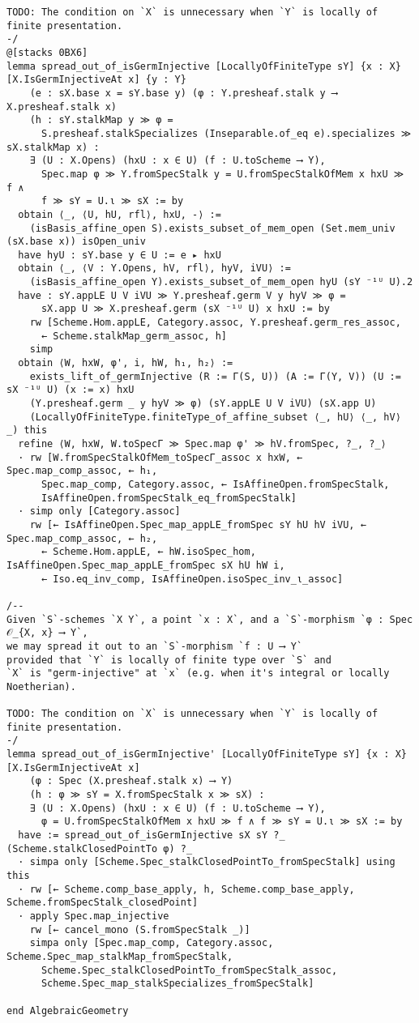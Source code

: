 \documentclass{article}
\begin{document}
\begin{lstlisting}[language=Lean, caption={SpreadingOut.lean}]
TODO: The condition on `X` is unnecessary when `Y` is locally of finite presentation.
-/
@[stacks 0BX6]
lemma spread_out_of_isGermInjective [LocallyOfFiniteType sY] {x : X} [X.IsGermInjectiveAt x] {y : Y}
    (e : sX.base x = sY.base y) (φ : Y.presheaf.stalk y ⟶ X.presheaf.stalk x)
    (h : sY.stalkMap y ≫ φ =
      S.presheaf.stalkSpecializes (Inseparable.of_eq e).specializes ≫ sX.stalkMap x) :
    ∃ (U : X.Opens) (hxU : x ∈ U) (f : U.toScheme ⟶ Y),
      Spec.map φ ≫ Y.fromSpecStalk y = U.fromSpecStalkOfMem x hxU ≫ f ∧
      f ≫ sY = U.ι ≫ sX := by
  obtain ⟨_, ⟨U, hU, rfl⟩, hxU, -⟩ :=
    (isBasis_affine_open S).exists_subset_of_mem_open (Set.mem_univ (sX.base x)) isOpen_univ
  have hyU : sY.base y ∈ U := e ▸ hxU
  obtain ⟨_, ⟨V : Y.Opens, hV, rfl⟩, hyV, iVU⟩ :=
    (isBasis_affine_open Y).exists_subset_of_mem_open hyU (sY ⁻¹ᵁ U).2
  have : sY.appLE U V iVU ≫ Y.presheaf.germ V y hyV ≫ φ =
      sX.app U ≫ X.presheaf.germ (sX ⁻¹ᵁ U) x hxU := by
    rw [Scheme.Hom.appLE, Category.assoc, Y.presheaf.germ_res_assoc,
      ← Scheme.stalkMap_germ_assoc, h]
    simp
  obtain ⟨W, hxW, φ', i, hW, h₁, h₂⟩ :=
    exists_lift_of_germInjective (R := Γ(S, U)) (A := Γ(Y, V)) (U := sX ⁻¹ᵁ U) (x := x) hxU
    (Y.presheaf.germ _ y hyV ≫ φ) (sY.appLE U V iVU) (sX.app U)
    (LocallyOfFiniteType.finiteType_of_affine_subset ⟨_, hU⟩ ⟨_, hV⟩ _) this
  refine ⟨W, hxW, W.toSpecΓ ≫ Spec.map φ' ≫ hV.fromSpec, ?_, ?_⟩
  · rw [W.fromSpecStalkOfMem_toSpecΓ_assoc x hxW, ← Spec.map_comp_assoc, ← h₁,
      Spec.map_comp, Category.assoc, ← IsAffineOpen.fromSpecStalk,
      IsAffineOpen.fromSpecStalk_eq_fromSpecStalk]
  · simp only [Category.assoc]
    rw [← IsAffineOpen.Spec_map_appLE_fromSpec sY hU hV iVU, ← Spec.map_comp_assoc, ← h₂,
      ← Scheme.Hom.appLE, ← hW.isoSpec_hom, IsAffineOpen.Spec_map_appLE_fromSpec sX hU hW i,
      ← Iso.eq_inv_comp, IsAffineOpen.isoSpec_inv_ι_assoc]

/--
Given `S`-schemes `X Y`, a point `x : X`, and a `S`-morphism `φ : Spec 𝒪_{X, x} ⟶ Y`,
we may spread it out to an `S`-morphism `f : U ⟶ Y`
provided that `Y` is locally of finite type over `S` and
`X` is "germ-injective" at `x` (e.g. when it's integral or locally Noetherian).

TODO: The condition on `X` is unnecessary when `Y` is locally of finite presentation.
-/
lemma spread_out_of_isGermInjective' [LocallyOfFiniteType sY] {x : X} [X.IsGermInjectiveAt x]
    (φ : Spec (X.presheaf.stalk x) ⟶ Y)
    (h : φ ≫ sY = X.fromSpecStalk x ≫ sX) :
    ∃ (U : X.Opens) (hxU : x ∈ U) (f : U.toScheme ⟶ Y),
      φ = U.fromSpecStalkOfMem x hxU ≫ f ∧ f ≫ sY = U.ι ≫ sX := by
  have := spread_out_of_isGermInjective sX sY ?_ (Scheme.stalkClosedPointTo φ) ?_
  · simpa only [Scheme.Spec_stalkClosedPointTo_fromSpecStalk] using this
  · rw [← Scheme.comp_base_apply, h, Scheme.comp_base_apply, Scheme.fromSpecStalk_closedPoint]
  · apply Spec.map_injective
    rw [← cancel_mono (S.fromSpecStalk _)]
    simpa only [Spec.map_comp, Category.assoc, Scheme.Spec_map_stalkMap_fromSpecStalk,
      Scheme.Spec_stalkClosedPointTo_fromSpecStalk_assoc,
      Scheme.Spec_map_stalkSpecializes_fromSpecStalk]

end AlgebraicGeometry

\end{lstlisting}
\end{document}
